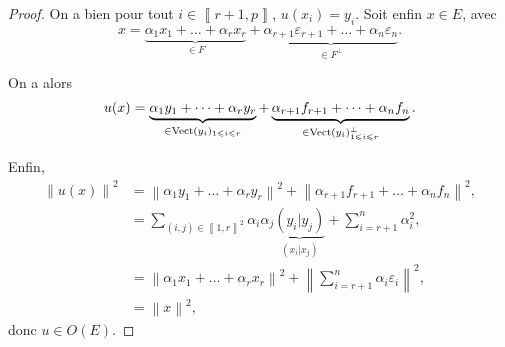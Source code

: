\documentclass[12pt]{article}
\begin{document}
\begin{proof}
	On a bien pour tout $i\in\left\llbracket r+1,p\right\rrbracket$, $u(x_i)=y_i$. Soit enfin $x\in E$, avec 
	\begin{equation}
		x=\underbrace{\alpha_1 x_1+\dots+\alpha_r x_r}_{\in F}+\underbrace{\alpha_{r+1}\varepsilon_{r+1}+\dots+\alpha_{n}\varepsilon_{n}}_{\in F^{\perp}}.	
	\end{equation}
	
	On a alors 
	\begin{equation}
		u(x)=\underbrace{\alpha_1 y_1+\dots+\alpha_{r}y_r}_{\in\operatorname{Vect}(y_i)_{1\leqslant i\leqslant r}}+\underbrace{\alpha_{r+1}f_{r+1}+\dots+\alpha_n f_n}_{\in \operatorname{Vect}(y_i)_{1\leqslant i\leqslant r}^{\perp}}.
	\end{equation}

	Enfin,
	\begin{align}
		\left\lVert u(x)\right\rVert^{2}
		&=\left\lVert \alpha_{1}y_{1}+\dots+\alpha_{r}y_{r}\right\rVert^{2}+\left\lVert \alpha_{r+1}f_{r+1}+\dots+\alpha_{n}f_{n}\right\rVert^{2},\\
		&=\sum_{(i,j)\in\left\llbracket1,r\right\rrbracket^{2}}\alpha_{i}\alpha_{j}\underbrace{(y_i|y_j)}_{(x_i|x_j)}+\sum_{i=r+1}^{n}\alpha_{i}^{2},\\
		&=\left\lVert \alpha_{1}x_{1}+\dots+\alpha_{r}x_{r}\right\rVert^{2}+\left\lVert \sum_{i=r+1}^{n}\alpha_{i}\varepsilon_{i}\right\rVert^{2},\\
		&=\left\lVert x\right\rVert^{2},
	\end{align}
	donc $u\in O(E)$.
\end{proof}
\end{document}
